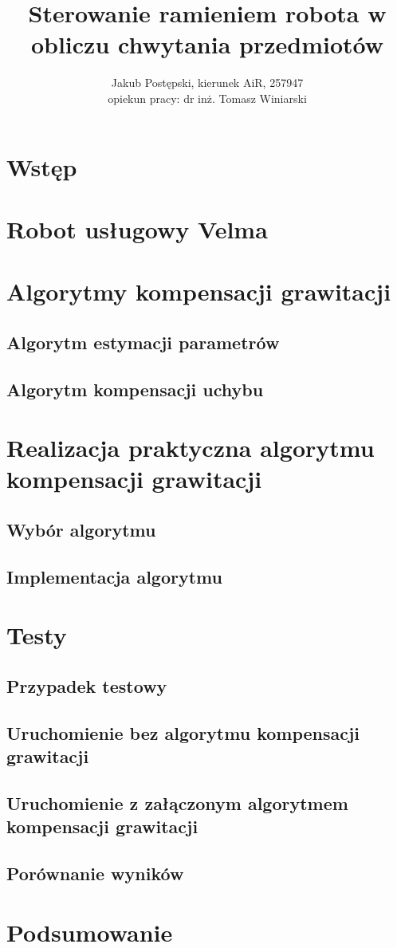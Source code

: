 \documentclass[12pt,a4paper]{article}
\begin{document}
	\title{Sterowanie ramieniem robota w obliczu chwytania przedmiotów}
	\author{Jakub Postępski, kierunek AiR, 257947 \\ opiekun pracy: dr inż. Tomasz Winiarski}
	\maketitle

	\tableofcontents
{}
	\newpage

	\section{Wstęp}
	\section{Robot usługowy Velma}
	\section{Algorytmy kompensacji grawitacji}
	\subsection{Algorytm estymacji parametrów}
	\subsection{Algorytm kompensacji uchybu}
	\section{Realizacja praktyczna algorytmu kompensacji grawitacji}
	\subsection{Wybór algorytmu}
	\subsection{Implementacja algorytmu}
	\section{Testy}
	\subsection{Przypadek testowy}
	\subsection{Uruchomienie bez algorytmu kompensacji grawitacji}
	\subsection{Uruchomienie z załączonym algorytmem kompensacji grawitacji}
	\subsection{Porównanie wyników}
	\section{Podsumowanie}
\end{document}
